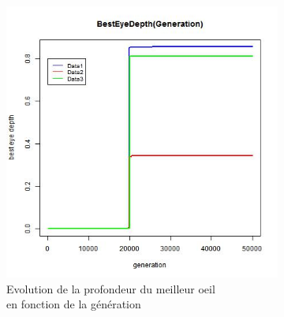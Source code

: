 \documentclass[a4paper,11pt]{article}
\begin{document}
\begin{figure}
\begin{subfigure}{.5\textwidth}
\includegraphics[width=1\linewidth]{best_eye_depth.jpeg}
\caption{Evolution de la profondeur du meilleur oeil \\en fonction de la génération}
\label{fig:modelisation}
\end{subfigure}
\caption{}
\label{fig:test}
\end{figure}

%
\end{document}
